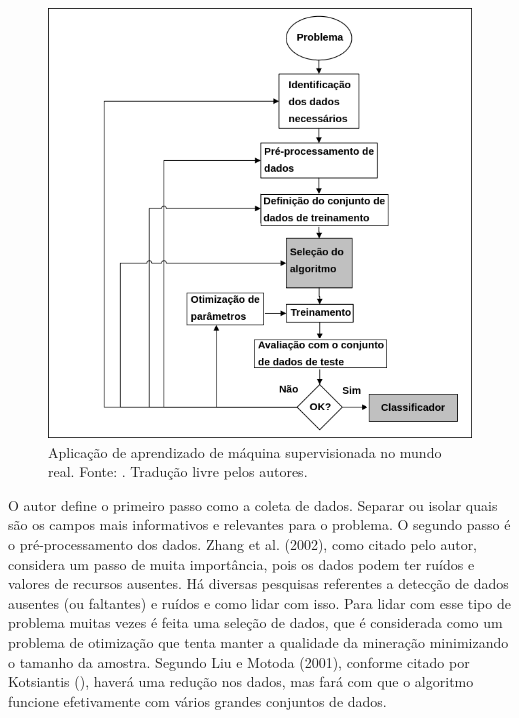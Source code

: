 \begin{figure}[H]
    \centering
    \includegraphics[scale=0.4]{figuras/referencial_teorico/aplicacao_ml.png}
    \caption[Aplicação de machine learning supervisionada no mundo real]{Aplicação de aprendizado de máquina supervisionada no mundo real. Fonte: \cite{Kotsiantis}. Tradução livre pelos autores.}
    \label{fig:aplicacao_ml}
\end{figure}

O autor define o primeiro passo como a coleta de dados. Separar ou isolar quais são os campos mais informativos e relevantes para o problema. O segundo passo é o pré-processamento dos dados. Zhang et al. (2002), como citado pelo autor, considera um passo de muita importância, pois os dados podem ter ruídos e valores de recursos ausentes. Há diversas pesquisas referentes a detecção de dados ausentes (ou faltantes) e ruídos e como lidar com isso. Para lidar com esse tipo de problema muitas vezes é feita uma seleção de dados, que é considerada como um problema de otimização que tenta manter a qualidade da mineração minimizando o tamanho da amostra. Segundo Liu e Motoda (2001), conforme citado por Kotsiantis (\citeyear{Kotsiantis}), haverá uma redução nos dados, mas fará com que o algoritmo funcione efetivamente com vários grandes conjuntos de dados.

